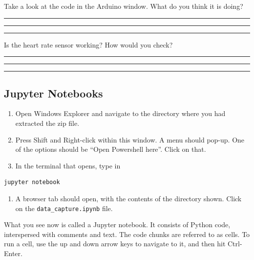\documentclass[11pt]{article}
\providecommand{\tightlist}{%
  \setlength{\itemsep}{0pt}\setlength{\parskip}{0pt}}
\begin{document}
\pagebreak

Take a look at the code in the Arduino window. What do you think it is
doing?

\vspace{1.5em}
\rule{16cm}{0.5pt}

\vspace{1.5em}
\rule{16cm}{0.5pt}

\vspace{1.5em}
\rule{16cm}{0.5pt}

Is the heart rate sensor working? How would you check?

\vspace{1.5em}
\rule{16cm}{0.5pt}

\vspace{1.5em}
\rule{16cm}{0.5pt}

\vspace{1.5em}
\rule{16cm}{0.5pt}

\hypertarget{jupyter-notebooks}{%
\subsection{Jupyter Notebooks}\label{jupyter-notebooks}}

\begin{enumerate}
\def\labelenumi{\arabic{enumi}.}
\tightlist
\item
  Open Windows Explorer and navigate to the directory where you had
  extracted the zip file.
\item
  Press Shift and Right-click within this window. A menu should pop-up.
  One of the options should be ``Open Powershell here''. Click on that.
\item
  In the terminal that opens, type in
\end{enumerate}

\begin{verbatim}
jupyter notebook
\end{verbatim}

\begin{enumerate}
\def\labelenumi{\arabic{enumi}.}
\setcounter{enumi}{3}
\tightlist
\item
  A browser tab should open, with the contents of the directory shown.
  Click on the \texttt{data\_capture.ipynb} file.
\end{enumerate}

What you see now is called a Jupyter notebook. It consists of Python
code, interspersed with comments and text. The code chunks are referred
to as cells. To run a cell, use the up and down arrow keys to navigate
to it, and then hit Ctrl-Enter.
\end{document}

